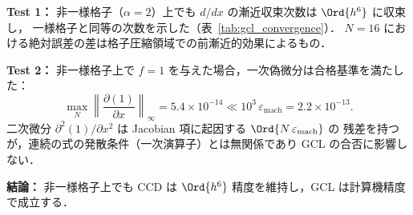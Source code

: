 \textbf{Test 1：}
非一様格子（$\alpha=2$）上でも $d/dx$ の漸近収束次数は $\Ord{h^6}$ に収束し，
一様格子と同等の次数を示した（表~\ref{tab:gcl_convergence}）．
$N=16$ における絶対誤差の差は格子圧縮領域での前漸近的効果によるもの．

\textbf{Test 2：}
非一様格子上で $f=1$ を与えた場合，一次偽微分は合格基準を満たした：
\[
  \max_{N}\left\|\frac{\partial(1)}{\partial x}\right\|_\infty
    = 5.4\!\times\!10^{-14}
    \ll 10^3\,\varepsilon_\mathrm{mach} = 2.2\!\times\!10^{-13}.
\]
二次微分 $\partial^2(1)/\partial x^2$ は Jacobian 項に起因する $\Ord{N\,\varepsilon_\mathrm{mach}}$ の
残差を持つが，連続の式の発散条件（一次演算子）とは無関係であり GCL の合否に影響しない．

\noindent\textbf{結論：}
非一様格子上でも CCD は $\Ord{h^6}$ 精度を維持し，GCL は計算機精度で成立する．
